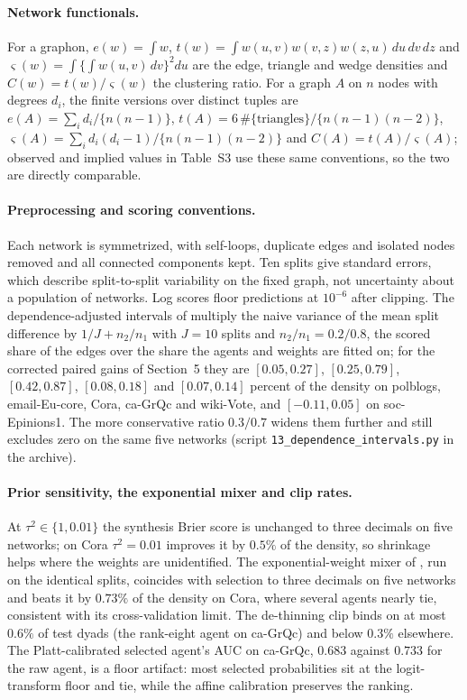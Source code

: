 \documentclass[12pt]{article}
\begin{document}
\paragraph{Network functionals.}
For a graphon, $e(w)=\int w$, $t(w)=\int w(u,v)w(v,z)w(z,u)\,du\,dv\,dz$ and $\varsigma(w)=\int\{\int w(u,v)\,dv\}^2du$ are the edge, triangle and wedge densities and $C(w)=t(w)/\varsigma(w)$ the clustering ratio. For a graph $A$ on $n$ nodes with degrees $d_i$, the finite versions over distinct tuples are $e(A)=\sum_id_i/\{n(n-1)\}$, $t(A)=6\,\#\{\text{triangles}\}/\{n(n-1)(n-2)\}$, $\varsigma(A)=\sum_id_i(d_i-1)/\{n(n-1)(n-2)\}$ and $C(A)=t(A)/\varsigma(A)$; observed and implied values in Table~S3 use these same conventions, so the two are directly comparable.

\paragraph{Preprocessing and scoring conventions.}
Each network is symmetrized, with self-loops, duplicate edges and isolated nodes removed and all connected components kept. Ten splits give standard errors, which describe split-to-split variability on the fixed graph, not uncertainty about a population of networks. Log scores floor predictions at $10^{-6}$ after clipping. The dependence-adjusted intervals of \citet{NadeauBengio2003} multiply the naive variance of the mean split difference by $1/J+n_2/n_1$ with $J=10$ splits and $n_2/n_1=0.2/0.8$, the scored share of the edges over the share the agents and weights are fitted on; for the corrected paired gains of Section~5 they are $[0.05,0.27]$, $[0.25,0.79]$, $[0.42,0.87]$, $[0.08,0.18]$ and $[0.07,0.14]$ percent of the density on polblogs, email-Eu-core, Cora, ca-GrQc and wiki-Vote, and $[-0.11,0.05]$ on soc-Epinions1. The more conservative ratio $0.3/0.7$ widens them further and still excludes zero on the same five networks (script \texttt{13\_dependence\_intervals.py} in the archive).

\paragraph{Prior sensitivity, the exponential mixer and clip rates.}
At $\tau^2\in\{1,0.01\}$ the synthesis Brier score is unchanged to three decimals on five networks; on Cora $\tau^2=0.01$ improves it by $0.5\%$ of the density, so shrinkage helps where the weights are unidentified. The exponential-weight mixer of \citet{LiLe2024}, run on the identical splits, coincides with selection to three decimals on five networks and beats it by $0.73\%$ of the density on Cora, where several agents nearly tie, consistent with its cross-validation limit. The de-thinning clip binds on at most $0.6\%$ of test dyads (the rank-eight agent on ca-GrQc) and below $0.3\%$ elsewhere. The Platt-calibrated selected agent's AUC on ca-GrQc, $0.683$ against $0.733$ for the raw agent, is a floor artifact: most selected probabilities sit at the logit-transform floor and tie, while the affine calibration preserves the ranking.
\end{document}

